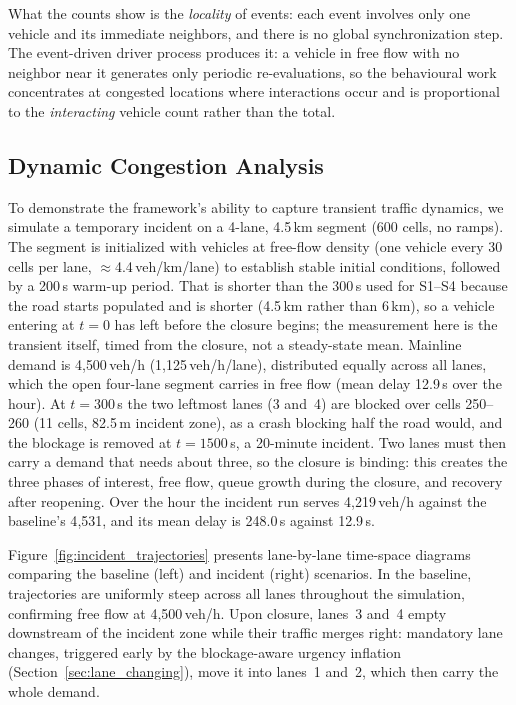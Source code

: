 \documentclass[review,number]{elsarticle}
\begin{document}
What the counts show is the \emph{locality} of events: each event involves only one vehicle and its immediate neighbors, and there is no global synchronization step. The event-driven driver process produces it: a vehicle in free flow with no neighbor near it generates only periodic re-evaluations, so the behavioural work concentrates at congested locations where interactions occur and is proportional to the \emph{interacting} vehicle count rather than the total.


\subsection{Dynamic Congestion Analysis}
\label{sec:exp_incident}

To demonstrate the framework's ability to capture transient traffic dynamics, we simulate a temporary incident on a 4-lane, 4.5\,km segment (600 cells, no ramps). The segment is initialized with vehicles at free-flow density (one vehicle every 30 cells per lane, $\approx$4.4\,veh/km/lane) to establish stable initial conditions, followed by a 200\,s warm-up period. That is shorter than the 300\,s used for S1--S4 because the road starts populated and is shorter (4.5\,km rather than 6\,km), so a vehicle entering at $t = 0$ has left before the closure begins; the measurement here is the transient itself, timed from the closure, not a steady-state mean. Mainline demand is 4{,}500\,veh/h (1{,}125\,veh/h/lane), distributed equally across all lanes, which the open four-lane segment carries in free flow (mean delay 12.9\,s over the hour). At $t = 300$\,s the two leftmost lanes (3 and~4) are blocked over cells 250--260 (11 cells, 82.5\,m incident zone), as a crash blocking half the road would, and the blockage is removed at $t = 1500$\,s, a 20-minute incident. Two lanes must then carry a demand that needs about three, so the closure is binding: this creates the three phases of interest, free flow, queue growth during the closure, and recovery after reopening. Over the hour the incident run serves 4{,}219\,veh/h against the baseline's 4{,}531, and its mean delay is 248.0\,s against 12.9\,s.

Figure~\ref{fig:incident_trajectories} presents lane-by-lane time-space diagrams comparing the baseline (left) and incident (right) scenarios. In the baseline, trajectories are uniformly steep across all lanes throughout the simulation, confirming free flow at 4{,}500\,veh/h. Upon closure, lanes~3 and~4 empty downstream of the incident zone while their traffic merges right: mandatory lane changes, triggered early by the blockage-aware urgency inflation (Section~\ref{sec:lane_changing}), move it into lanes~1 and~2, which then carry the whole demand.
\end{document}
